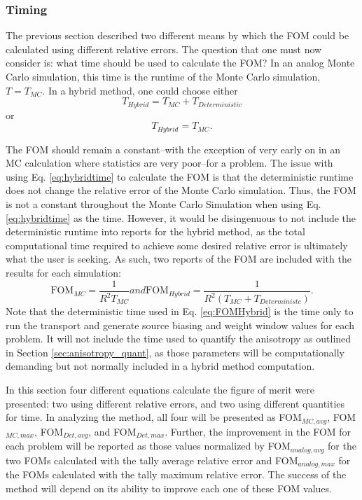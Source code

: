 \subsubsection{Timing}

The previous section described two different means by which the FOM could be
calculated using different relative errors. The question that one must
now consider is: what time should be used to
calculate the FOM? In an analog Monte Carlo simulation, this time is the runtime
of the Monte Carlo simulation, $T = T_{MC}$. In a hybrid method, one could choose
either
\begin{equation}
  T_{Hybrid} = T_{MC} + T_{Deterministic}
\label{eq:hybridtime}
\end{equation}
or
\begin{equation}
  T_{Hybrid} = T_{MC} .
\end{equation}

The FOM should remain a constant--with the exception of very early on in an MC
calculation where statistics are very poor--for a problem. The issue with using
Eq. \eqref{eq:hybridtime} to calculate the FOM is that the deterministic runtime
does not change the relative error of the Monte Carlo simulation. Thus, the FOM
is not a constant throughout the Monte Carlo Simulation when using Eq.
\eqref{eq:hybridtime} as the time.
However, it would be disingenuous to not include the deterministic runtime into
reports for the hybrid method, as the total computational time required to
achieve some desired relative error is ultimately what the user is seeking. As
such, two reports of the FOM are included with the results for each simulation:
\begin{subequations}
  \begin{equation}
    \text{FOM}_{MC} = \frac{1}{R^{2}T_{MC}}
  \label{eq:FOMMC}
  \end{equation}
and
  \begin{equation}
    \text{FOM}_{Hybrid} = \frac{1}{R^{2}(T_{MC} + T_{Deterministc})} .
  \label{eq:FOMHybrid}
  \end{equation}
  \label{eq:FOMtime}
\end{subequations}
Note that the deterministic time used in Eq. \eqref{eq:FOMHybrid} is the time only
to run the transport and generate source biasing and weight window values for
each problem. It will not include the time used to quantify the anisotropy as
outlined in Section \ref{sec:anisotropy_quant}, as those parameters will be
computationally demanding but not normally included in a hybrid method
computation.

In this section four different equations calculate the figure of merit were presented: two
using different relative errors, and two using different quantities
for time. In analyzing the method, all four will be presented as FOM$_{MC,avg}$,
FOM$_{MC,max}$, FOM$_{Det,avg}$, and FOM$_{Det,max}$. Further, the improvement
in the FOM for each problem will be reported as those values normalized by
FOM$_{analog,avg}$ for the two FOMs calculated with the tally average relative
error and FOM$_{analog,max}$ for the FOMs calculated with the tally maximum
relative error. The success of the method will depend on its ability to improve
each one of these FOM values.

